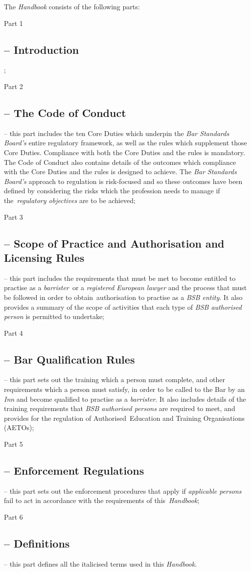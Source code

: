 The \emph{Handbook} consists of the following parts:
\begin{numlist}\item Part 1 \subsection{-- Introduction};
\item Part 2 \subsection{-- The Code of Conduct} -- this part includes the ten
Core Duties which underpin the \emph{Bar Standards Board's} entire
regulatory framework, as well as the rules which supplement those Core
Duties. Compliance with both the Core Duties and the rules is mandatory.
The Code of Conduct also contains details of the outcomes which
compliance with the Core Duties and the rules is designed to achieve.
The \emph{Bar Standards Board's} approach to regulation is risk-focused
and so these outcomes have been defined by considering the risks which
the profession needs to manage if the~\emph{regulatory objectives} are
to be achieved;
\item Part 3 \subsection{-- Scope of Practice and Authorisation and Licensing
Rules} -- this part includes the requirements that must be met to become
entitled to practise as a \emph{barrister~}or a \emph{registered
\emph{European lawyer}} and the process that must be followed in order
to obtain~authorisation to practise as a \emph{BSB entity}. It also
provides a summary of the scope of activities that each type of
\emph{BSB authorised person} is permitted to undertake;
\item Part 4 \subsection{-- Bar Qualification Rules} -- this part sets out the
training which a person must complete, and other requirements which a
person must satisfy, in order to be called to the Bar by an \emph{Inn}
and become qualified to practise as a \emph{barrister}. It also includes
details of the training requirements that \emph{BSB authorised persons}
are required to meet, and provides for the regulation of
Authorised~Education and Training Organisations (AETOs);
\item Part 5 \subsection{-- Enforcement Regulations} -- this part sets out the
enforcement procedures that apply if \emph{applicable persons} fail to
act in accordance with the requirements of this~\emph{Handbook};
\item Part 6 \subsection{-- Definitions} -- this part defines all the
italicised terms used in this \emph{Handbook}.
\end{numlist}
